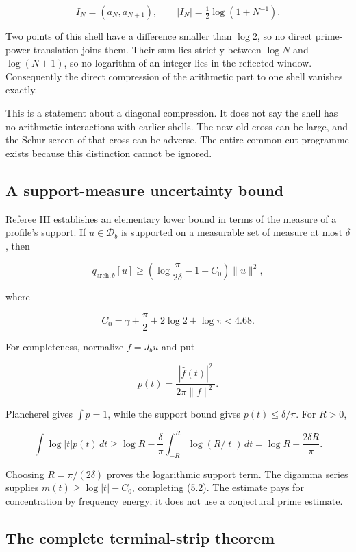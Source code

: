 \documentclass[
  10pt,
  a4paper,
  10pt,
  oneside,
  openany]{book}
\begin{document}
\[
I_N=(a_N,a_{N+1}),
\qquad |I_N|=\tfrac12\log(1+N^{-1}).
\tag{5.1}\label{eq:5.1}
\]

Two points of this shell have a difference smaller than \(\log2\), so no
direct prime-power translation joins them. Their sum lies strictly
between \(\log N\) and \(\log(N+1)\), so no logarithm of an integer lies
in the reflected window. Consequently the direct compression of the
arithmetic part to one shell vanishes exactly.

This is a statement about a diagonal compression. It does not say the
shell has no arithmetic interactions with earlier shells. The new-old
cross can be large, and the Schur screen of that cross can be adverse.
The entire common-cut programme exists because this distinction cannot
be ignored.

\subsection{A support-measure uncertainty
bound}\label{a-support-measure-uncertainty-bound}

Referee III establishes an elementary lower bound in terms of the
measure of a profile's support. If \(u\in\mathcal D_b\) is supported on
a measurable set of measure at most \(\delta\), then

\[
q_{\mathrm{arch},b}[u]
\ge\left(\log\frac{\pi}{2\delta}-1-C_0\right)\|u\|^2,
\tag{5.2}\label{eq:5.2}
\]

where

\[
C_0=\gamma+\frac\pi2+2\log2+\log\pi<4.68.
\tag{5.3}\label{eq:5.3}
\]

For completeness, normalize \(f=J_bu\) and put

\[
p(t)=\frac{|\widehat f(t)|^2}{2\pi\|f\|^2}.
\tag{5.4}\label{eq:5.4}
\]

Plancherel gives \(\int p=1\), while the support bound gives
\(p(t)\le\delta/\pi\). For \(R>0\),

\[
\int\log|t|p(t)\,dt
\ge\log R-\frac{\delta}{\pi}
\int_{-R}^{R}\log(R/|t|)\,dt
=\log R-\frac{2\delta R}{\pi}.
\tag{5.5}\label{eq:5.5}
\]

Choosing \(R=\pi/(2\delta)\) proves the logarithmic support term. The
digamma series supplies \(m(t)\ge\log|t|-C_0\), completing (5.2). The
estimate pays for concentration by frequency energy; it does not use a
conjectural prime estimate.

\subsection{The complete terminal-strip
theorem}\label{the-complete-terminal-strip-theorem}
\end{document}
